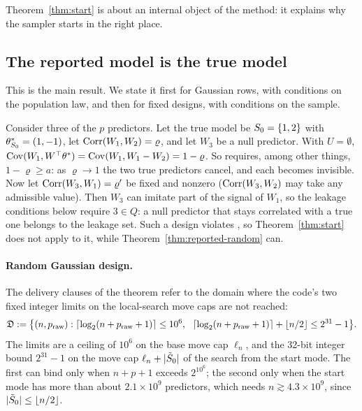 Theorem~\ref{thm:start} is about an internal object of the method: it explains why the sampler starts in the right
place.

\subsection{The reported model is the true model}\label{sec:reported}

This is the main result. We state it first for Gaussian rows, with conditions on the population law, and then for fixed
designs, with conditions on the sample.

\begin{example}\label{ex:visibility}
Consider three of the $p$ predictors. Let the true model be $S_0=\{1,2\}$ with $\theta^*_{S_0}=(1,-1)$, let
$\operatorname{Corr}(W_1,W_2)=\varrho$, and let $W_3$ be a null predictor. With $U=\emptyset$,
$\operatorname{Cov}(W_1,W^\top\theta^*)=\operatorname{Cov}(W_1,W_1-W_2)=1-\varrho$. So  requires, among other things, $1-\varrho\ge a$: as
$\varrho\to1$ the two true predictors cancel, and each becomes invisible. Now let $\operatorname{Corr}(W_3,W_1)=\varrho'$ be fixed and
nonzero ($\operatorname{Corr}(W_3,W_2)$ may take any admissible value). Then $W_3$ can imitate part of the signal of $W_1$, so the
leakage conditions below require $3\in Q$: a null predictor that stays correlated with a true one belongs to the leakage
set. Such a design violates , so Theorem~\ref{thm:start} does not apply to it, while
Theorem~\ref{thm:reported-random} can.
\end{example}

\paragraph{Random Gaussian design.}


The delivery clauses of the theorem refer to the domain where the code's two fixed integer limits on the local-search move
caps are not reached:
\[
  \Dom:=\big\{(n,\praw):\lceil\log_2(n+\praw+1)\rceil\le10^6,\ \ \lceil\log_2(n+\praw+1)\rceil+\lfloor n/2\rfloor\le2^{31}-1\big\}.
\]
The limits are a ceiling of $10^6$ on the base move cap $\ell_n$, and the 32-bit integer bound $2^{31}-1$ on the move cap
$\ell_n+\lvert \tilde S_0\rvert$ of the search from the start mode. The first can bind only when $n+p+1$ exceeds $2^{10^6}$; the second only when the start mode has more than
about $2.1\times10^9$ predictors, which needs $n\gtrsim4.3\times10^9$, since $\lvert \tilde S_0\rvert\le\lfloor n/2\rfloor$.

